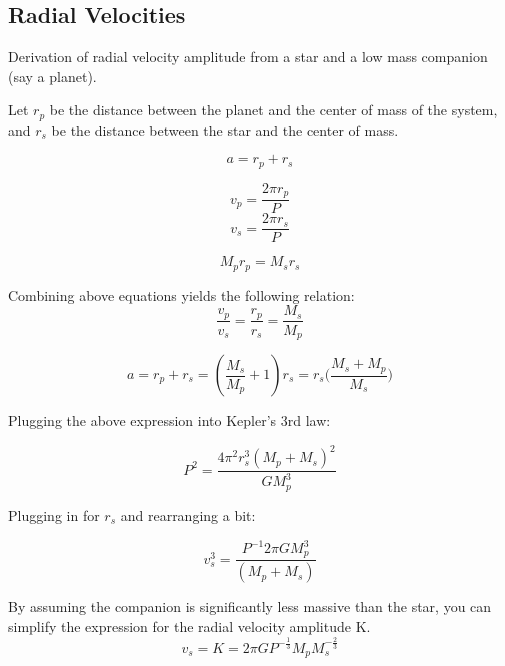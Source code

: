\subsection{Radial Velocities}

Derivation of radial velocity amplitude from a star and a low mass companion (say a planet).

Let $r_p$ be the distance between the planet and the center of mass of the system, and $r_s$ be the distance between the star and the center of mass.

\begin{equation}
a = r_p + r_s
\end{equation}

\begin{equation}
v_p = \frac{2\pi r_p}{P}
\end{equation}
\begin{equation}
v_s = \frac{2\pi r_s}{P}
\end{equation}

\begin{equation}
M_pr_p = M_sr_s
\end{equation}

Combining above equations yields the following relation:
\begin{equation}
\frac{v_p}{v_s} = \frac{r_p}{r_s} = \frac{M_s}{M_p}
\end{equation} 

\begin{equation}
a = r_p + r_s = (\frac{M_s}{M_p} + 1)r_s = r_s\big(\frac{M_s + M_p}{M_s}\big)
\end{equation}

Plugging the above expression into Kepler's 3rd law:

\begin{equation}
P^2 = \frac{4\pi^2r_s^3(M_p + M_s)^2}{GM_p^3}
\end{equation}

Plugging in for $r_s$ and rearranging a bit:

\begin{equation}
v_s^3 = \frac{P^{-1}2\pi GM_p^3}{(M_p + M_s)}
\end{equation}

By assuming the companion is significantly less massive than the star, you can simplify the expression for the radial velocity amplitude K.  
\begin{equation}
v_s = K = 2\pi G P^{-\frac{1}{3}}M_pM_s^{-\frac{2}{3}}
\end{equation}

